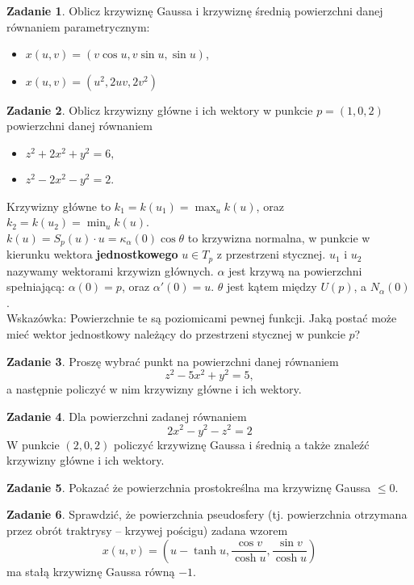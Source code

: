 \documentclass[a4paper,11pt]{article}
\theoremstyle{definition}\newtheorem{exercise}{Zadanie}
\theoremstyle{definition}\newtheorem{remark}{Uwaga}
\begin{document}
\begin{exercise}
Oblicz krzywiznę Gaussa i krzywiznę średnią powierzchni danej równaniem 
parametrycznym:
\begin{itemize}
 \item $x(u,v)=(v\cos u,v\sin u,\sin u)$,
 \item $x(u,v)=(u^2,2uv,2v^2)$
\end{itemize}
\end{exercise}

\begin{exercise}
Oblicz krzywizny główne i ich wektory w punkcie $p=(1,0,2)$ powierzchni danej 
równaniem
\begin{itemize}
 \item $z^2+2x^2+y^2=6,$
\item $z^2-2x^2-y^2=2$.
\end{itemize}
\small{Krzywizny główne to $k_1=k(u_1)=\max_{u}k(u)$, oraz 
$k_2=k(u_2)=\min_{u}k(u)$.\\$k(u)=S_p(u)\cdot u=\kappa_\alpha(0)\cos{\theta}$ 
to krzywizna normalna, w punkcie w kierunku wektora \textbf{jednostkowego} 
$u\in T_p$ z przestrzeni stycznej. $u_1$ i $u_2$ nazywamy wektorami krzywizn 
głównych. $\alpha$ jest krzywą na powierzchni spełniającą: $\alpha(0)=p$, oraz 
$\alpha'(0)=u$. $\theta$ jest kątem między $U(p)$, a $N_\alpha(0)$.\\[0.1in] 
Wskazówka: Powierzchnie te są poziomicami pewnej funkcji. Jaką postać może mieć 
wektor jednostkowy należący do przestrzeni stycznej w punkcie $p$?} 
\end{exercise}

\begin{exercise}
Proszę wybrać punkt na powierzchni danej równaniem\[z^2-5x^2+y^2=5,\]a 
następnie policzyć w nim krzywizny główne i ich wektory.
\end{exercise}


\begin{exercise}
Dla powierzchni zadanej równaniem
\[2 x^2 - y^2 - z^2 = 2\]
W punkcie $(2,0,2)$ policzyć krzywiznę Gaussa i średnią a także znaleźć 
krzywizny główne i ich wektory.
\end{exercise}


\begin{exercise}
 Pokazać że powierzchnia prostokreślna ma krzywiznę Gaussa $\leqslant 0$.
\end{exercise}


\begin{exercise}
 Sprawdzić, że powierzchnia pseudosfery (tj. powierzchnia otrzymana przez 
obr\'ot traktrysy -- krzywej pościgu) zadana wzorem
\[x(u,v)=\left(u-\tanh u, \frac{\cos v}{\cosh u},\frac{\sin v}{\cosh u}\right)\]
ma stałą krzywiznę Gaussa r\'owną $-1$.
\end{exercise}
\end{document}

